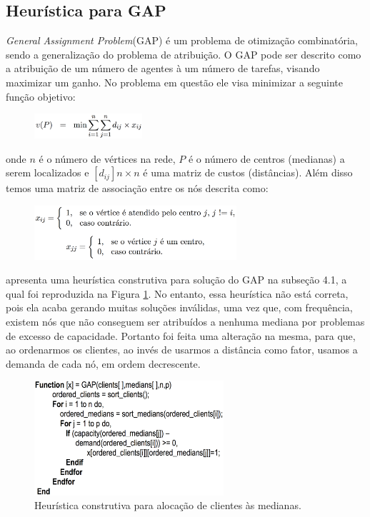 \subsection{Heurística para GAP} \label{sub:gap}
\textit{General Assignment Problem}(GAP) é um problema de otimização combinatória, sendo a generalização do problema de atribuição. O GAP pode ser descrito como a atribuição de um número de agentes à um número de tarefas, visando maximizar um ganho. No problema em questão ele visa minimizar a seguinte função objetivo:

\begin{figure}[H]	
  \centering
  \includegraphics[width=4cm,keepaspectratio]{images/objective_function.png}
\end{figure}

onde $n$ é o número de vértices na rede, $P$ é o número de centros (medianas) a serem
localizados e $[d_{ij}] n \times n$ é uma matriz de custos (distâncias). Além disso temos uma matriz de associação entre os nós descrita como:

\begin{figure}[H]	
  \centering
  \includegraphics[width=7.5cm,keepaspectratio]{images/association.png}
\end{figure}

\cite{de2005max} apresenta uma heurística construtiva para solução do GAP na subseção 4.1, a qual foi reproduzida na Figura \ref{fig:gap}. No entanto, essa heurística não está correta, pois ela acaba gerando muitas soluções inválidas, uma vez que, com frequência, existem nós que não conseguem ser atribuídos a nenhuma mediana por problemas de excesso de capacidade. Portanto foi feita uma alteração na mesma, para que, ao ordenarmos os clientes, ao invés de usarmos a distância como fator, usamos a demanda de cada nó, em ordem decrescente. 

\begin{figure}[h]	
  \centering
  \includegraphics[width=7cm,keepaspectratio]{images/gap.png}
  \caption{Heurística construtiva para alocação de clientes às medianas.}
  \label{fig:gap}
\end{figure}

